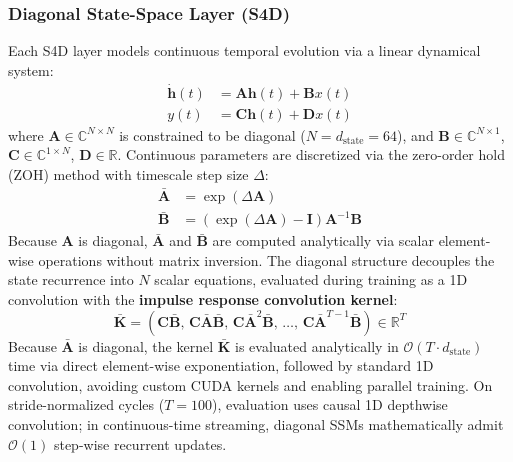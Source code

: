 \documentclass[journal]{IEEEtran}
\newcommand{\Kbar}{\bar{\mathbf{K}}}
\newcommand{\Abar}{\bar{\mathbf{A}}}
\newcommand{\Bbar}{\bar{\mathbf{B}}}
\newcommand{\dstate}{d_{\mathrm{state}}}
\begin{document}
\subsubsection{Diagonal State-Space Layer (S4D)}
Each S4D layer models continuous temporal evolution via a linear dynamical system:
\begin{align}
    \dot{\mathbf{h}}(t) &= \mathbf{A} \mathbf{h}(t) + \mathbf{B} x(t) \label{eq:ssm_h} \\
    y(t) &= \mathbf{C} \mathbf{h}(t) + \mathbf{D} x(t) \label{eq:ssm_y}
\end{align}
where $\mathbf{A} \in \mathbb{C}^{N \times N}$ is constrained to be diagonal ($N = \dstate = 64$), and $\mathbf{B} \in \mathbb{C}^{N \times 1}$, $\mathbf{C} \in \mathbb{C}^{1 \times N}$, $\mathbf{D} \in \mathbb{R}$. Continuous parameters are discretized via the zero-order hold (ZOH) method with timescale step size $\Delta$:
\begin{align}
    \Abar &= \exp(\Delta \mathbf{A}) \label{eq:zoh_a} \\
    \Bbar &= (\exp(\Delta \mathbf{A}) - \mathbf{I}) \mathbf{A}^{-1} \mathbf{B} \label{eq:zoh_b}
\end{align}
Because $\mathbf{A}$ is diagonal, $\Abar$ and $\Bbar$ are computed analytically via scalar element-wise operations without matrix inversion. The diagonal structure decouples the state recurrence into $N$ scalar equations, evaluated during training as a 1D convolution with the \textbf{impulse response convolution kernel}:
\begin{equation}
    \Kbar = \left(\mathbf{C}\Bbar,\, \mathbf{C}\Abar\Bbar,\, \mathbf{C}\Abar^2\Bbar,\, \dots,\, \mathbf{C}\Abar^{T-1}\Bbar\right) \in \mathbb{R}^T
    \label{eq:kernel}
\end{equation}
Because $\Abar$ is diagonal, the kernel $\Kbar$ is evaluated analytically in $\mathcal{O}(T \cdot \dstate)$ time via direct element-wise exponentiation, followed by standard 1D convolution, avoiding custom CUDA kernels and enabling parallel training. On stride-normalized cycles ($T=100$), evaluation uses causal 1D depthwise convolution; in continuous-time streaming, diagonal SSMs mathematically admit $\mathcal{O}(1)$ step-wise recurrent updates.
\end{document}
